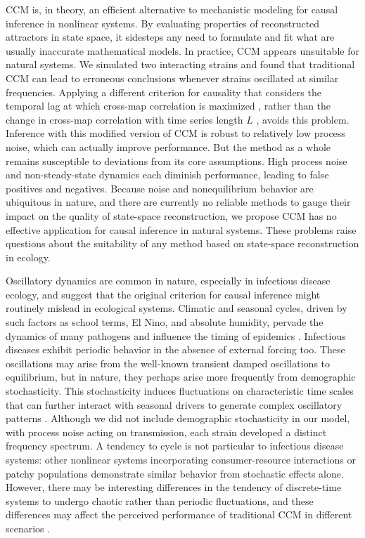\documentclass[10pt]{article}
\begin{document}
CCM is, in theory, an efficient alternative to mechanistic modeling for causal inference in nonlinear systems.
By evaluating properties of reconstructed attractors in state space, it sidesteps any need to formulate and fit what are usually inaccurate mathematical models.
In practice, CCM appears unsuitable for natural systems.
We simulated two interacting strains and found that traditional CCM can lead to erroneous conclusions whenever strains oscillated at similar frequencies.
Applying a different criterion for causality that considers the temporal lag at which cross-map correlation is maximized \cite{Ye2015}, rather than the change in cross-map correlation with time series length $L$ \cite{Sugihara2012}, avoids this problem.
Inference with this modified version of CCM is robust to relatively low process noise, which can actually improve performance.
But the method as a whole remains susceptible to deviations from its core assumptions. 
High process noise and non-steady-state dynamics each diminish performance, leading to false positives and negatives.
Because noise and nonequilibrium behavior are ubiquitous in nature, and there are currently no reliable methods to gauge their impact on the quality of state-space reconstruction, we propose CCM has no effective application for causal inference in natural systems.
These problems raise questions about the suitability of any method based on state-space reconstruction in ecology.

Oscillatory dynamics are common in nature, especially in infectious disease ecology, and suggest that the original criterion for causal inference might routinely mislead in ecological systems.
Climatic and seasonal cycles, driven by such factors as school terms, El Nino, and absolute humidity, pervade the dynamics of many pathogens and influence the timing of epidemics \cite{Shaman2010, Laneri2010, Finkenstadt2000, Altizer2006, Metcalf2009}. 
Infectious diseases exhibit periodic behavior in the absence of external forcing too.
These oscillations may arise from the well-known transient damped oscillations to equilibrium, but in nature, they perhaps arise more frequently from demographic stochasticity. 
This stochasticity induces fluctuations on characteristic time scales that can further interact with seasonal drivers to generate complex oscillatory patterns \cite{Alonso2006, Nguyen2008, Rand1991, Rohani2002}. 
Although we did not include demographic stochasticity in our model, with process noise acting on transmission, each strain developed a distinct frequency spectrum.
A tendency to cycle is not particular to infectious disease systems: other nonlinear systems incorporating consumer-resource interactions \cite{Boland2009, McKane2005, Turchin2003} or patchy populations \cite{Nisbet1978, Durrett1994} demonstrate similar behavior from stochastic effects alone.
However, there may be interesting differences in the tendency of discrete-time systems to undergo chaotic rather than periodic fluctuations, and these differences may affect the perceived performance of traditional CCM in different scenarios \cite{Sugihara2012}.
\end{document}
